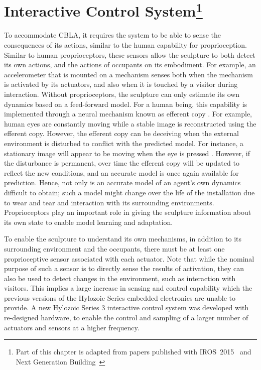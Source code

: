 \chapter[Interactive Control System]
{Interactive Control System\footnote{Part of this chapter is adapted from papers published with IROS~2015~\cite{Chan2015} and Next Generation  \mbox{Building}~\cite{Gorbet2015}}} 
\label{chap:ctrl_system}

To accommodate CBLA, it requires the system to be able to sense the consequences of its actions, similar to the human capability for proprioception. Similar to human proprioceptors, these sensors allow the sculpture to both detect its own actions, and the actions of occupants on its embodiment. For example, an accelerometer that is mounted on a mechanism senses both when the mechanism is activated by its actuators, and also when it is touched by a visitor during interaction. Without proprioceptors, the sculpture can only estimate its own dynamics based on a feed-forward model. For a human being, this capability is implemented through a neural mechanism known as efferent copy \cite{Cios1997}. For example, human eyes are constantly moving while a stable image is reconstructed using the efferent copy. However, the efferent copy can be deceiving when the external environment is disturbed to conflict with the predicted model. For instance, a stationary image will appear to be moving when the eye is pressed \cite{Bridgeman2007}. However, if the disturbance is permanent, over time the efferent copy will be updated to reflect the new conditions, and an accurate model is once again available for prediction. Hence, not only is an accurate model of an agent's own dynamics difficult to obtain; such a model might change over the life of the installation due to wear and tear and interaction with its surrounding environments. Proprioceptors play an important role in giving the sculpture information about its own state to enable model learning and adaptation.

To enable the sculpture to understand its own mechanisms, in addition to its surrounding environment and the occupants, there must be at least one proprioceptive sensor associated with each actuator. Note that while the nominal purpose of such a sensor is to directly sense the results of activation, they can also be used to detect changes in the environment, such as interaction with visitors. This implies a large increase in sensing and control capability which the previous versions of the Hylozoic Series embedded electronics \cite{Beesley2010} are unable to provide. A new Hylozoic Series 3 interactive control system was developed with re-designed hardware, to enable the control and sampling of a larger number of actuators and sensors at a higher frequency. 

